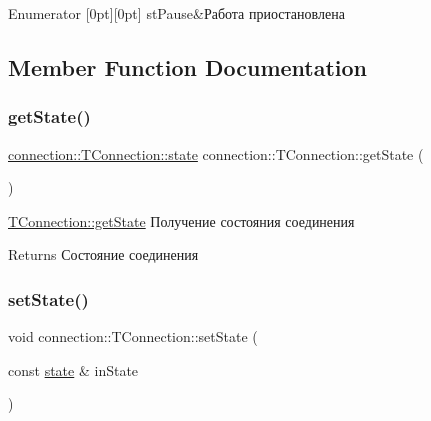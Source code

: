 \begin{DoxyEnumFields}{Enumerator}
[0pt][0pt]{}\mbox{\label{classconnection_1_1_t_connection_aee7dfb7510592bd2697ab6f906b9612ca194b89ec7cadeb35331341be96c05f76}} 
st\+Pause&Работа приостановлена \\
\hline

\end{DoxyEnumFields}


\subsection{Member Function Documentation}
\mbox{\label{classconnection_1_1_t_connection_a7944d50c5733279cf0fdfd8c87c3b237}} 
\subsubsection{\texorpdfstring{get\+State()}{getState()}}
{\footnotesize\ttfamily \hyperlink{classconnection_1_1_t_connection_aee7dfb7510592bd2697ab6f906b9612c}{connection\+::\+T\+Connection\+::state} connection\+::\+T\+Connection\+::get\+State (\begin{DoxyParamCaption}{ }\end{DoxyParamCaption})}



\hyperlink{classconnection_1_1_t_connection_a7944d50c5733279cf0fdfd8c87c3b237}{T\+Connection\+::get\+State} Получение состояния соединения 

\begin{DoxyReturn}{Returns}
Состояние соединения 
\end{DoxyReturn}
\mbox{\label{classconnection_1_1_t_connection_aa61ae6037f6b70cd97c9fc9c04f43629}} 
\subsubsection{\texorpdfstring{set\+State()}{setState()}}
{\footnotesize\ttfamily void connection\+::\+T\+Connection\+::set\+State (\begin{DoxyParamCaption}\item[{const \hyperlink{classconnection_1_1_t_connection_aee7dfb7510592bd2697ab6f906b9612c}{state} \&}]{in\+State }\end{DoxyParamCaption})}



